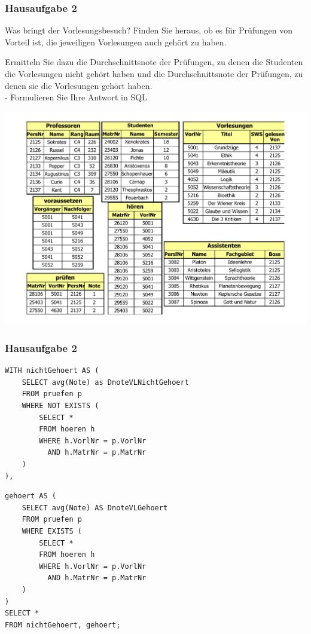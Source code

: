 \begin{frame}[fragile]
	\frametitle{Hausaufgabe 2}
	\vspace{0.5cm}

	\begin{multicols}{2}
		Was bringt der Vorlesungsbesuch? Finden Sie heraus, ob es für Prüfungen von Vorteil ist, 
		die jeweiligen Vorlesungen auch gehört zu haben. 
		
		Ermitteln Sie dazu die Durchschnittsnote der Prüfungen, zu denen die Studenten 
		die Vorlesungen nicht gehört haben und die Durchschnittsnote der 
		Prüfungen, zu denen sie die Vorlesungen gehört haben. \\
		- Formulieren Sie Ihre Antwort in SQL
		\vfill\columnbreak

		\begin{center}
			\includegraphics[height=.6\paperheight]{../img/uni.pdf}
		\end{center}
	\end{multicols}
\end{frame}

\begin{frame}[fragile]
	\frametitle{Hausaufgabe 2}
	\vspace{0.5cm}

	\begin{multicols}{2}
		\begin{verbatim}
WITH nichtGehoert AS (
	SELECT avg(Note) as DnoteVLNichtGehoert
	FROM pruefen p
	WHERE NOT EXISTS (
		SELECT *
		FROM hoeren h
		WHERE h.VorlNr = p.VorlNr
		  AND h.MatrNr = p.MatrNr
	)
),
		\end{verbatim}
		\vfill\columnbreak

		\begin{verbatim}
gehoert AS (
	SELECT avg(Note) AS DnoteVLGehoert
	FROM pruefen p
	WHERE EXISTS (
		SELECT *
		FROM hoeren h
		WHERE h.VorlNr = p.VorlNr
		  AND h.MatrNr = p.MatrNr
	)
)
SELECT *
FROM nichtGehoert, gehoert;
		\end{verbatim}
	\end{multicols}
\end{frame}


